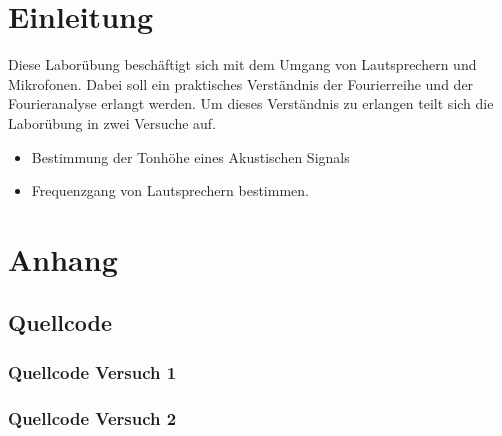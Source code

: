 \documentclass[12pt,oneside,a4paper]{report}
\begin{document}




\clearpage

%
%


%
%


%
%


%
%




\setcounter{page}{1}
%
%
\chapter{Einleitung}
\label{chap:EINL}
Diese Laborübung beschäftigt sich mit dem Umgang von Lautsprechern und 
Mikrofonen. Dabei soll ein praktisches Verständnis der Fourierreihe und der
Fourieranalyse erlangt werden.
Um dieses Verständnis zu erlangen teilt sich die Laborübung in zwei
Versuche auf.
\begin{itemize}
\item {Bestimmung der Tonhöhe eines Akustischen Signals}
\item {Frequenzgang von Lautsprechern bestimmen.}
\end{itemize} 


%
%


%
%


%
%
\renewcommand\thesection{A.\arabic{section}}
\renewcommand\thesubsection{\thesection.\arabic{subsection}}

\chapter*{Anhang}
\label{chap:APPENDIX}
\addtocounter{chapter}{1}
\setcounter{section}{0}

\section{Quellcode}
\label{chap:APPENDIX_SOURCECODE}

\subsection{Quellcode Versuch 1}
\label{chap:APPENDIX_SOURCECODE_V1}

\subsection{Quellcode Versuch 2}
\label{chap:APPENDIX_SOURCECODE_V2}




%
%

\end{document}
